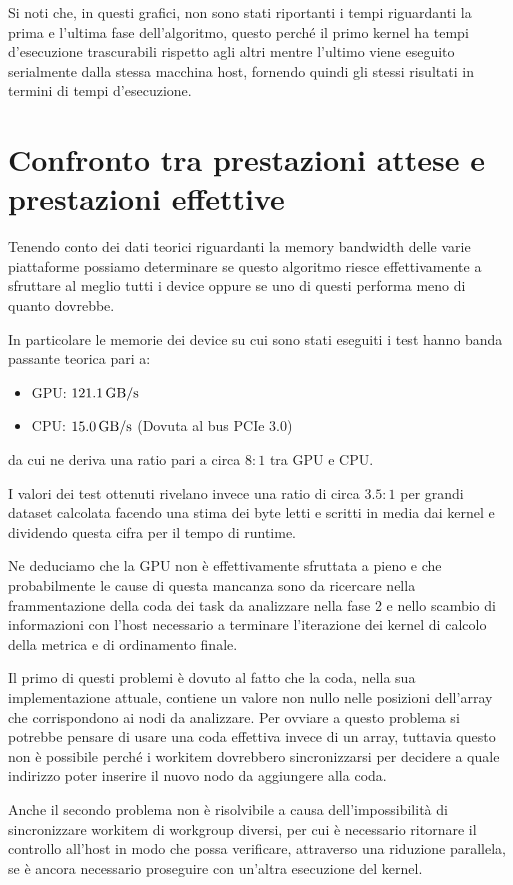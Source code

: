 \newpage
Si noti che, in questi grafici, non sono stati riportanti i tempi riguardanti la prima e l'ultima fase dell'algoritmo, questo perché il primo kernel ha tempi d'esecuzione trascurabili rispetto agli altri mentre l'ultimo viene eseguito serialmente dalla stessa macchina host, fornendo quindi gli stessi risultati in termini di tempi d'esecuzione.

\section{Confronto tra prestazioni attese e prestazioni effettive}
Tenendo conto dei dati teorici riguardanti la memory bandwidth delle varie piattaforme possiamo determinare se questo algoritmo riesce effettivamente a sfruttare al meglio tutti i device oppure se uno di questi performa meno di quanto dovrebbe.

In particolare le memorie dei device su cui sono stati eseguiti i test hanno banda passante teorica pari a:
\begin{itemize}
	\item GPU: $\SI{121.1}{\giga\byte/\second}$
	\item CPU: $\SI{15.0}{\giga\byte/\second}$ (Dovuta al bus PCIe 3.0)
\end{itemize}
da cui ne deriva una ratio pari a circa $8:1$ tra GPU e CPU.

I valori dei test ottenuti rivelano invece una ratio di circa $3.5:1$ per grandi dataset calcolata facendo una stima dei byte letti e scritti in media dai kernel e dividendo questa cifra per il tempo di runtime.

Ne deduciamo che la GPU non è effettivamente sfruttata a pieno e che probabilmente le cause di questa mancanza sono da ricercare nella frammentazione della coda dei task da analizzare nella fase 2 e nello scambio di informazioni con l'host necessario a terminare l'iterazione dei kernel di calcolo della metrica e di ordinamento finale.

Il primo di questi problemi è dovuto al fatto che la coda, nella sua implementazione attuale, contiene un valore non nullo nelle posizioni dell'array che corrispondono ai nodi da analizzare. Per ovviare a questo problema si potrebbe pensare di usare una coda effettiva invece di un array, tuttavia questo non è possibile perché i workitem dovrebbero sincronizzarsi per decidere a quale indirizzo poter inserire il nuovo nodo da aggiungere alla coda.

Anche il secondo problema non è risolvibile a causa dell'impossibilità di sincronizzare workitem di workgroup diversi, per cui è necessario ritornare il controllo all'host in modo che possa verificare, attraverso una riduzione parallela, se è ancora necessario proseguire con un'altra esecuzione del kernel. 

